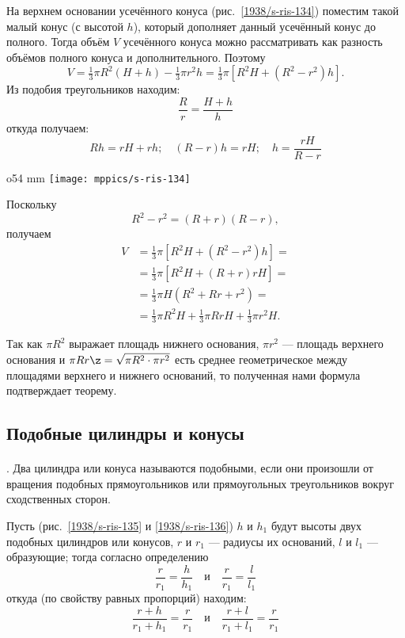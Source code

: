На верхнем основании усечённого конуса (рис.~\ref{1938/s-ris-134}) поместим такой малый конус (с высотой $h$), который дополняет данный усечённый конус до полного.
Тогда объём $V$ усечённого конуса можно рассматривать как разность объёмов полного конуса и дополнительного.
Поэтому
\[V =\tfrac13 \pi R^2(H + h)-\tfrac13 \pi r^2h=\tfrac13 \pi [R^2H+(R^2-r^2)h].\]
Из подобия треугольников находим:
\[\frac Rr=\frac{H+h}h\]
откуда получаем:
\[Rh = rH + rh;
\quad
(R-r)h = rH;
\quad
h= \frac{rH}{R-r}
\]

\begin{wrapfigure}[10]{o}{54 mm}
\vskip-0mm
\centering
\texttt{[image: mppics/s-ris-134]}
\caption{}\label{1938/s-ris-134}
\vskip-0mm
\end{wrapfigure}

Поскольку 
\[R^2-r^2=(R+r)(R-r),\] 
получаем
\begin{align*}
V &= \tfrac13 \pi [R^2H+(R^2-r^2)h]=
\\
&= \tfrac13\pi [R^2H + (R +r)rH]=
\\
&=
\tfrac13\pi H(R^2 + Rr + r^2)
= 
\\
&=\tfrac13\pi R^2 H+\tfrac13\pi Rr H+\tfrac13\pi r^2 H.
\end{align*}

Так как $\pi R^2$ выражает площадь нижнего основания, $\pi r^2$ — площадь верхнего основания и $\pi Rr \z= \sqrt{\pi R^2\cdot \pi r^2}$ есть среднее геометрическое между площадями верхнего и нижнего оснований, то полученная нами формула подтверждает теорему.

\subsection*{Подобные цилиндры и конусы}

\paragraph{}\label{1938/s123}
.
Два цилиндра или конуса называются подобными, если они произошли от вращения подобных прямоугольников или прямоугольных треугольников вокруг сходственных сторон.

Пусть (рис.~\ref{1938/s-ris-135} и \ref{1938/s-ris-136}) $h$ и $h_1$ будут высоты двух подобных цилиндров или конусов, $r$ и $r_1$ — радиусы их оснований, $l$ и $l_1$ — образующие;
тогда согласно определению
\[\frac r{r_1}=\frac h{h_1}\quad\text{и}\quad\frac r{r_1}=\frac l{l_1}\]
откуда (по свойству равных пропорций) находим:
\[\frac {r+h}{r_1+h_1}=\frac r{r_1}
\quad\text{и}\quad
\frac {r+l}{r_1+l_1}=\frac r{r_1}\]

